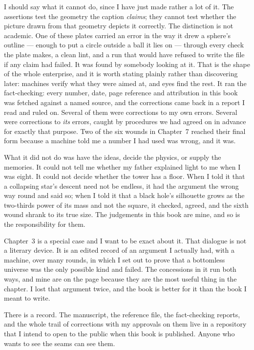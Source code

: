 \documentclass[fontsize=11pt,paper=a4,pagesize=auto,parskip=half-]{scrbook}
\begin{document}
I should say what it cannot do, since I have just made rather a lot of it. The assertions test the geometry the caption \emph{claims}; they cannot test whether the picture drawn from that geometry depicts it correctly. The distinction is not academic. One of these plates carried an error in the way it drew a sphere's outline --- enough to put a circle outside a ball it lies on --- through every check the plate makes, a clean lint, and a run that would have refused to write the file if any claim had failed. It was found by somebody looking at it. That is the shape of the whole enterprise, and it is worth stating plainly rather than discovering later: machines verify what they were aimed at, and eyes find the rest. It ran the fact-checking: every number, date, page reference and attribution in this book was fetched against a named source, and the corrections came back in a report I read and ruled on. Several of them were corrections to my own errors. Several were corrections to \emph{its} errors, caught by procedures we had agreed on in advance for exactly that purpose. Two of the six wounds in Chapter~7 reached their final form because a machine told me a number I had used was wrong, and it was.

What it did not do was have the ideas, decide the physics, or supply the memories. It could not tell me whether my father explained light to me when I was eight. It could not decide whether the tower has a floor. When I told it that a collapsing star's descent need not be endless, it had the argument the wrong way round and said so; when I told it that a black hole's silhouette grows as the two-thirds power of its mass and not the square, it checked, agreed, and the sixth wound shrank to its true size. The judgements in this book are mine, and so is the responsibility for them.

Chapter~3 is a special case and I want to be exact about it. That dialogue is not a literary device. It is an edited record of an argument I actually had, with a machine, over many rounds, in which I set out to prove that a bottomless universe was the only possible kind and failed. The concessions in it run both ways, and mine are on the page because they are the most useful thing in the chapter. I lost that argument twice, and the book is better for it than the book I meant to write.

There is a record. The manuscript, the reference file, the fact-checking reports, and the whole trail of corrections with my approvals on them live in a repository that I intend to open to the public when this book is published. Anyone who wants to see the seams can see them.
\end{document}
